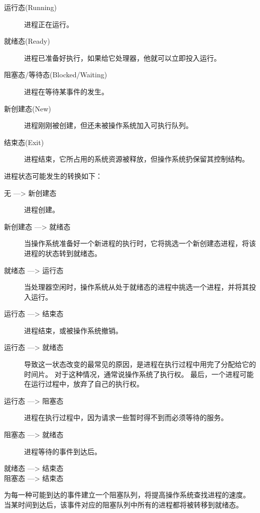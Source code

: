 {{{            \begin{description}
                \item[运行态(Running)] 进程正在运行。
                \item[就绪态(Ready)] 进程已准备好执行，如果给它处理器，他就可以立即投入运行。
                \item[阻塞态/等待态(Blocked/Waiting)] 进程在等待某事件的发生。
                \item[新创建态(New)] 进程刚刚被创建，但还未被操作系统加入可执行队列。
                \item[结束态(Exit)] 进程结束，它所占用的系统资源被释放，但操作系统扔保留其控制结构。
            \end{description}

            进程状态可能发生的转换如下：

            \begin{description}
                \item[无 ---> 新创建态] 进程创建。
                \item[新创建态 ---> 就绪态] 当操作系统准备好一个新进程的执行时，它将挑选一个新创建态进程，将该进程的状态转到就绪态。
                \item[就绪态 ---> 运行态] 当处理器空闲时，操作系统从处于就绪态的进程中挑选一个进程，并将其投入运行。
                \item[运行态 ---> 结束态] 进程结束，或被操作系统撤销。
                \item[运行态 ---> 就绪态]
                {
                    导致这一状态改变的最常见的原因，是进程在执行过程中用完了分配给它的时间片。
                    对于这种情况，通常说操作系统了执行权。
                    最后，一个进程可能在运行过程中，放弃了自己的执行权。
                }
                \item[运行态 ---> 阻塞态] 进程在执行过程中，因为请求一些暂时得不到而必须等待的服务。
                \item[阻塞态 ---> 就绪态] 进程等待的事件到达后。
                \item[就绪态 ---> 结束态]
                \item[阻塞态 ---> 结束态]
            \end{description}

            为每一种可能到达的事件建立一个阻塞队列，将提高操作系统查找进程的速度。
            当某时间到达后，该事件对应的阻塞队列中所有的进程都将被转移到就绪态。

}}}
